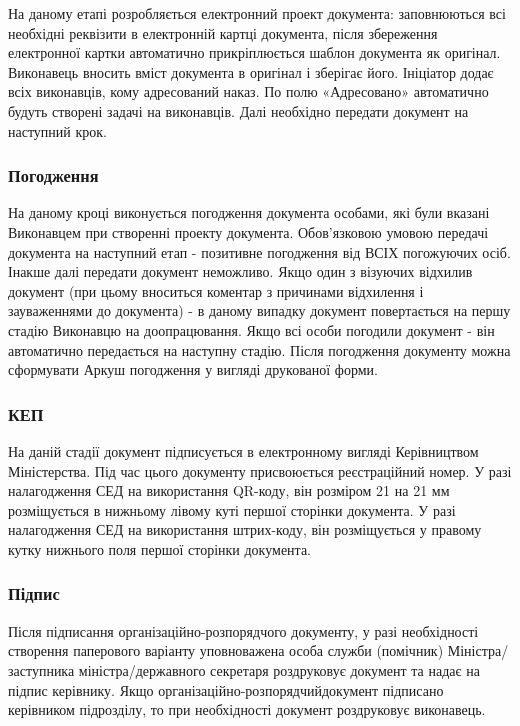 На даному етапі розробляється електронний проект документа:
заповнюються всі необхідні реквізити в електронній картці документа,
після збереження електронної картки автоматично прикріплюється шаблон
документа як оригінал. Виконавець вносить вміст документа в оригінал
і зберігає його. Ініціатор додає всіх виконавців, кому адресований
наказ. По полю «Адресовано» автоматично будуть створені задачі на виконавців.
Далі необхідно передати документ на наступний крок.

\subsubsection*{Погодження}

На даному кроці виконується погодження документа особами, які були вказані
Виконавцем при створенні проекту документа.
Обов'язковою умовою передачі документа на наступний етап - позитивне погодження
від ВСІХ погожуючих осіб. Інакше далі передати документ неможливо. Якщо один
з візуючих відхилив документ (при цьому вноситься коментар з причинами
відхилення і зауваженнями до документа) - в даному випадку документ
повертається на першу стадію Виконавцю на доопрацювання.
Якщо всі особи погодили документ - він автоматично передається на наступну стадію.
Після погодження документу можна сформувати Аркуш погодження у вигляді друкованої форми.

\subsubsection*{КЕП}

На даній стадії документ підписується в електронному вигляді Керівництвом Міністерства.
Під час цього документу присвоюється реєстраційний номер.
У разі налагодження СЕД на використання QR-коду, він розміром
21 на 21 мм розміщується в нижньому лівому куті першої сторінки документа.
У разі налагодження СЕД на використання штрих-коду, він розміщується у правому кутку нижнього поля першої сторінки документа.

\subsubsection*{Підпис}

Після підписання організаційно-розпорядчого документу, у разі
необхідності створення паперового варіанту уповноважена особа
служби (помічник) Міністра/заступника міністра/державного секретаря
роздруковує документ та надає на підпис керівнику.
Якщо організаційно-розпорядчийдокумент підписано керівником
підрозділу, то при необхідності документ роздруковує виконавець.

